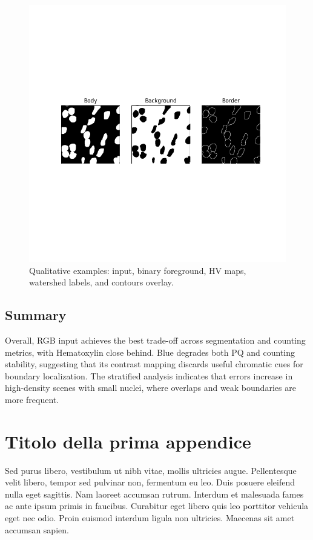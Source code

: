 \documentclass[target=bach,aauheader=,style=]{thud}
\begin{document}
\begin{figure}[ht]
    \centering
    \includegraphics[width=.98\linewidth]{imgs/3ch_binarymask.png}
    \caption{Qualitative examples: input, binary foreground, HV maps, watershed labels, and contours overlay.}
    \label{fig:qualitative}
\end{figure}

\section{Summary}
Overall, RGB input achieves the best trade-off across segmentation and counting metrics, with Hematoxylin close behind. 
Blue degrades both PQ and counting stability, suggesting that its contrast mapping discards useful chromatic cues for boundary localization. 
The stratified analysis indicates that errors increase in high-density scenes with small nuclei, where overlaps and weak boundaries are more frequent.

\appendix


\chapter{Titolo della prima appendice}
Sed purus libero, vestibulum ut nibh vitae, mollis ultricies augue. Pellentesque velit libero, tempor sed pulvinar non, fermentum eu leo. Duis posuere eleifend nulla eget sagittis. Nam laoreet accumsan rutrum. Interdum et malesuada fames ac ante ipsum primis in faucibus. Curabitur eget libero quis leo porttitor vehicula eget nec odio. Proin euismod interdum ligula non ultricies. Maecenas sit amet accumsan sapien.
\end{document}
